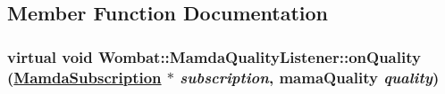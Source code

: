 \subsection{Member Function Documentation}
\hypertarget{classWombat_1_1MamdaQualityListener_a0677726b0844568e6f172d0707b46d9}{
\subsubsection[onQuality]{\setlength{\rightskip}{0pt plus 5cm}virtual void Wombat::Mamda\-Quality\-Listener::on\-Quality (\hyperlink{classWombat_1_1MamdaSubscription}{Mamda\-Subscription} $\ast$ {\em subscription}, mama\-Quality {\em quality})}}
\label{classWombat_1_1MamdaQualityListener_a0677726b0844568e6f172d0707b46d9}


